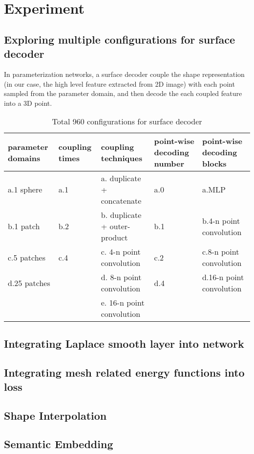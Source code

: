 \section{Experiment}
\subsection{Exploring multiple configurations for surface decoder}
In parameterization networks, a surface decoder couple the shape representation (in our case, the high level feature extracted from 2D image) with each point sampled from the parameter domain, and then decode the each coupled feature into a 3D point. 
\begin{table*}
	\caption{Total 960 configurations for surface decoder}
	\label{tab:mulconfig}
	\centering
	\begin{tabular}{l | l | l | l | l}
		parameter domains & coupling times &coupling techniques & point-wise decoding number & point-wise decoding blocks\\
		\hline
		a.1 sphere	 & a.1 & a. duplicate + concatenate 	& a.0	& a.MLP \\
		b.1 patch    & b.2 & b. duplicate + outer-product   & b.1   & b.4-n point convolution \\
		c.5 patches	 & c.4 & c. 4-n point convolution       & c.2   & c.8-n point convolution \\
		d.25 patches &  ~  & d. 8-n point convolution       & d.4   & d.16-n point convolution  \\
		~            &  ~  & e. 16-n point convolution              &  ~						 
	\end{tabular}
\end{table*}
\subsection{Integrating Laplace smooth layer into network}

\subsection{Integrating mesh related energy functions into loss}

\subsection{Shape Interpolation}

\subsection{Semantic Embedding}
